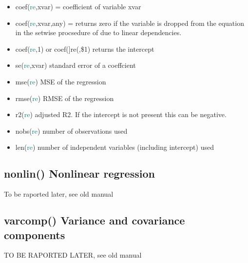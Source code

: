 \begin{itemize}
\item   \textcolor{VioletRed}{coef}(\textcolor{teal}{re},xvar) = coefficient of variable xvar
\item   \textcolor{VioletRed}{coef}(\textcolor{teal}{re},xvar,any) = returns zero if the variable is dropped from
the equation in the setwise procsedure of
due to linear dependencies.
\item  \textcolor{VioletRed}{coef}(\textcolor{teal}{re},1) or \textcolor{VioletRed}{coef}(]re(,\$1) returns the intercept
\item  \textcolor{VioletRed}{se}(\textcolor{teal}{re},xvar) standard error of a coeffcient
\item  \textcolor{VioletRed}{mse}(\textcolor{teal}{re}) MSE of the regression
\item  \textcolor{VioletRed}{rmse}(\textcolor{teal}{re}) RMSE of the regression
\item 	\textcolor{VioletRed}{r2}(\textcolor{teal}{re}) adjusted R2. If the intercept is not present this can be negative.
\item 	\textcolor{VioletRed}{nobs}(\textcolor{teal}{re}) number of observations used
\item 	\textcolor{VioletRed}{len}(\textcolor{teal}{re}) number of independent variables (including intercept) used
\end{itemize}
\subsection{\textcolor{VioletRed}{nonlin}() Nonlinear regression}
\label{nonlin}
To be raported later, see old manual
\subsection{\textcolor{VioletRed}{varcomp}() Variance and covariance components}
\label{varcomp}
TO BE RAPORTED LATER, see old manual
